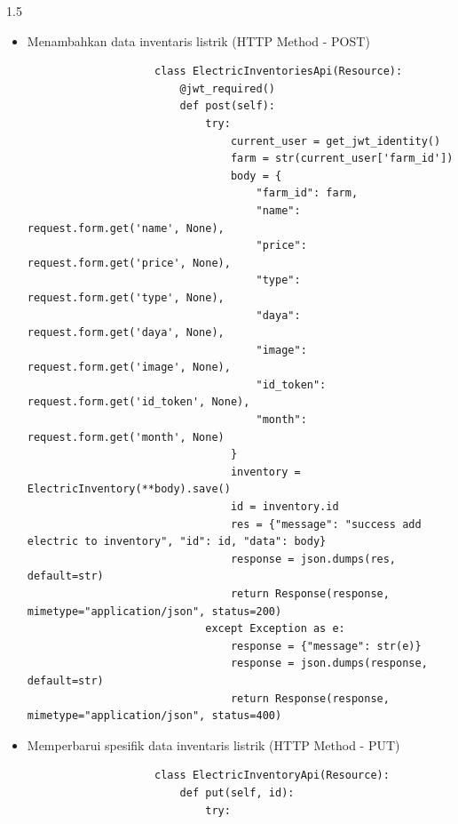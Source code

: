 \begin{spacing}{1.5}
\begin{enumerate}
\begin{enumerate}
\begin{itemize}
				\begin{lstlisting}
					class ElectricInventoryApi(Resource):
						def get(self, id):
							try:
								pipeline = {"$match": {"id_int": int(id)}},
								testing = ElectricInventory.objects.aggregate(pipeline)
								temp = list(testing)
								if len(temp) == 0:
									res = {"message": 'no data found'}
									response = json.dumps(res, default=str)
									return Response(response, mimetype="application/json", status=200)
								response = json.dumps({
									'status': 'success',
									'data': temp[0],
								}, default=str)
								return Response(response, mimetype="application/json", status=200)
							except Exception as e:
								response = {"message": e}
								response = json.dumps(response, default=str)
								return Response(response, mimetype="application/json", status=400)
				\end{lstlisting}

				\item Menambahkan data inventaris listrik (HTTP Method - POST)
				
				\begin{lstlisting}
					class ElectricInventoriesApi(Resource):
						@jwt_required()
						def post(self):
							try:
								current_user = get_jwt_identity()
								farm = str(current_user['farm_id'])
								body = {
									"farm_id": farm,
									"name": request.form.get('name', None),
									"price": request.form.get('price', None),
									"type": request.form.get('type', None),
									"daya": request.form.get('daya', None),
									"image": request.form.get('image', None),
									"id_token": request.form.get('id_token', None),
									"month": request.form.get('month', None)
								}
								inventory = ElectricInventory(**body).save()
								id = inventory.id
								res = {"message": "success add electric to inventory", "id": id, "data": body}
								response = json.dumps(res, default=str)
								return Response(response, mimetype="application/json", status=200)
							except Exception as e:
								response = {"message": str(e)}
								response = json.dumps(response, default=str)
								return Response(response, mimetype="application/json", status=400)
				\end{lstlisting}

				\item Memperbarui spesifik data inventaris listrik (HTTP Method - PUT)
				
				\begin{lstlisting}
					class ElectricInventoryApi(Resource):
						def put(self, id):
							try:
					

\end{lstlisting}
\end{itemize}
\end{enumerate}
\end{enumerate}
\end{spacing}
